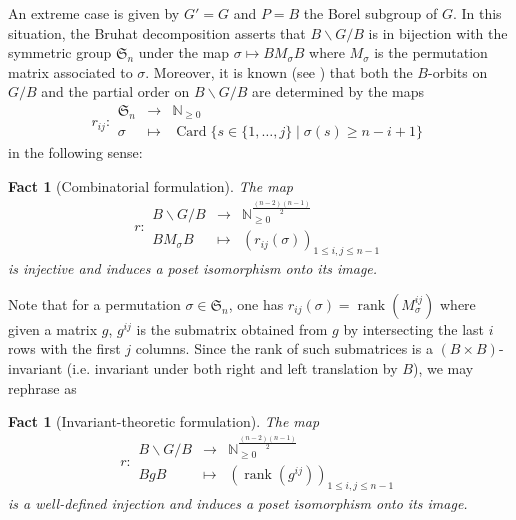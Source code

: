 \documentclass[pdftex]{sigma}
\numberwithin{equation}{section}
\theoremstyle{definition}
\newcommand{\rank}{\operatorname{rank}}
\newcommand{\N}{\mathbb{N}}
\newcounter{countfactD}
\theoremstyle{plain}
\theoremstyle{plain}
\newtheorem{fact}{Fact}
\newtheorem{factD}[countfactD]{Fact}
\theoremstyle{plain}
\theoremstyle{plain}
\begin{document}
An extreme case is given by $G' = G$ and $P = B$ the Borel subgroup of $G$. In this situation, the Bruhat decomposition asserts that $B \backslash G/B$ is in bijection with the symmetric group $\mathfrak S_n$ under the map $\sigma \mapsto BM_\sigma B$ where $M_\sigma$ is the permutation matrix associated to $\sigma$.
Moreover, it is known (see \cite[§10.5]{fulton_tableaux}) that both the $B$-orbits on $G/B$ and the partial order on $B\backslash G/B$ are determined by the maps
\begin{equation*}
	r_{ij} : \begin{array}{ccc}
	\mathfrak S_n & \to & \N_{\geqslant 0} \\
	\sigma & \mapsto & \operatorname{Card}\{s\in \{1,\dots,j\} \mid \sigma(s) \geqslant n-i+1\}
\end{array}
\end{equation*}
in the following sense:
\begin{fact}[Combinatorial formulation]\label{Fact Bruhat}
	The map 
	\begin{equation*}
		r : \begin{array}{ccc}
	B\backslash G/B & \to & \N_{\geqslant 0}^{\frac{(n-2)(n-1)}{2}} \\
	B M_\sigma B & \mapsto & (r_{ij}(\sigma))_{1 \leqslant i,j \leqslant n-1}
\end{array}
	\end{equation*}
	is injective and induces a poset isomorphism onto its image.
\end{fact}
Note that for a permutation $\sigma \in \mathfrak S_n$, one has $r_{ij}(\sigma) = \rank(M_\sigma^{ij})$ where given a matrix $g$, $g^{ij}$ is the submatrix obtained from $g$ by intersecting the last $i$ rows with the first $j$ columns.
Since the rank of such submatrices is a $(B \times B)$-invariant (i.e. invariant under both right and left translation by $B$), we may rephrase  as
\begin{factD}[Invariant-theoretic formulation]
	The map 
	\begin{equation*}
		r : \begin{array}{ccc}
	B\backslash G/B & \to & \N_{\geqslant 0}^{\frac{(n-2)(n-1)}{2}} \\
	BgB & \mapsto & (\rank(g^{ij}))_{1 \leqslant i,j \leqslant n-1}
\end{array}
	\end{equation*} is a well-defined injection and induces a poset isomorphism onto its image.

	
\end{factD}
\end{document}
